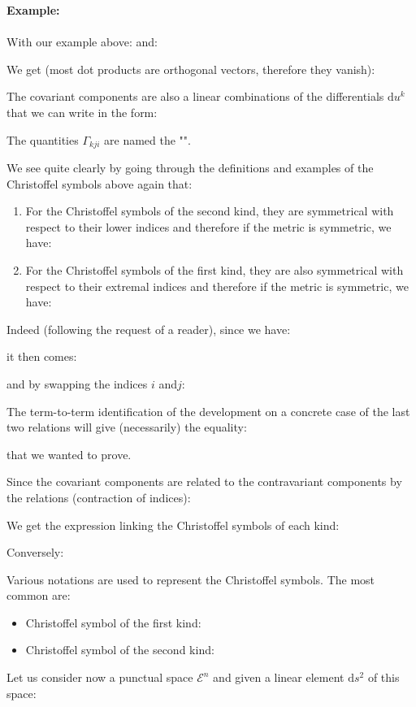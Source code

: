 	\begin{tcolorbox}[colframe=black,colback=white,sharp corners]
	\textbf{{\Large {}}Example:}\\\\
	With our example above:
	and:
	
	We get (most dot products are orthogonal vectors, therefore they vanish):
	
	\end{tcolorbox}
	The covariant components are also a linear combinations of the  differentials $\mathrm{d}u^k$ that we can write in the form:
	
	The quantities $\Gamma_{kji}$ are named the "\label{christoffel symbols of the first kind}".

	We see quite clearly by going through the definitions and examples of the Christoffel symbols above again that:
\begin{enumerate}
	\item For the Christoffel symbols of the second kind, they are symmetrical with respect to their lower indices and therefore if the metric is symmetric, we have:
	
	
	\item For the Christoffel symbols of the first kind, they are also symmetrical with respect to their extremal indices and therefore if the metric is symmetric, we have:
	
	\end{enumerate}
	Indeed (following the request of a reader), since we have:
	
	it then comes:
	
	and by swapping the indices $i$ and$ j$:
	
	The term-to-term identification of the development on a concrete case of the last two relations will give (necessarily) the equality:
	
	that we wanted to prove.

	Since the covariant components are related to the contravariant components by the relations (contraction of indices):
	
	We get the expression linking the Christoffel symbols of each kind:
	
	Conversely:
	
	\begin{tcolorbox}[title=Remark,colframe=black,arc=10pt]
	Various notations are used to represent the Christoffel symbols. The most common are:
	\begin{itemize}
		\item Christoffel symbol of the first kind:
		

		\item Christoffel symbol of the second kind:
		
	\end{itemize}
	\end{tcolorbox}
	Let us consider now a punctual space $\mathcal{E}^n$ and given a linear element $\mathrm{d}s^2$ of this space:
	
